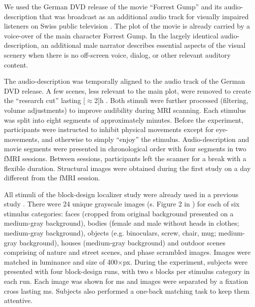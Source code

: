 \documentclass[english]{article}
\begin{document}
We used the German DVD release \citep{ForrestGumpDVD} of the movie ``Forrest
Gump'' \citep{ForrestGumpMovie} and its audio-description that was broadcast as
an additional audio track for visually impaired listeners on Swiss public
television \citep{ForrestGumpGermanAD}.
The plot of the movie is already carried by a voice-over of the main character
Forrest Gump.
In the largely identical audio-description, an additional male narrator
describes essential aspects of the visual scenery when there is no off-screen
voice, dialog, or other relevant auditory content.

The audio-description was temporally aligned to the audio track of the German
DVD release. A few scenes, less relevant to the main plot, were removed to create
the ``research cut'' lasting \unit[$\approx$2]{h} \citep{hanke2014audiomovie,
hanke2016simultaneous}.
Both stimuli were further processed (filtering, volume adjustments) to improve
audibility during MRI scanning.
Each stimulus was split into eight segments of approximately \unit[15]{minutes}.
Before the experiment, participants were instructed to inhibit physical
movements except for eye-movements, and otherwise to simply ``enjoy'' the
stimulus.
Audio-description and movie segments were presented in chronological order with
four segments in two fMRI sessions. Between sessions, participants left the
scanner for a break with a flexible duration. Structural images were obtained
during the first study on a day different from the fMRI session.

All stimuli of the block-design localizer study were already used in a previous study
\citep{haxby2011common}.
%
There were 24 unique grayscale images (s. Figure 2 in
\citep{sengupta2016extension}) for each of six stimulus categories:
faces (cropped from original background presented on a medium-gray background),
bodies (female and male without heads in clothes; medium-gray background),
objects (e.g. binoculars, screw, chair, mug; medium-gray background), houses
(medium-gray background) and outdoor scenes comprising of nature and street
scenes, and phase scrambled images.
Images were matched in luminance and size of 400$\times$\unit[400]{px}.
During the experiment, subjects were presented with four block-design runs, with
two \unit[16]{s} blocks per stimulus category in each run.
Each image was shown for \unit[900]{ms} and images were separated by a fixation
cross lasting \unit[100]{ms}.
Subjects also performed a one-back matching task to keep them attentive.
\end{document}
